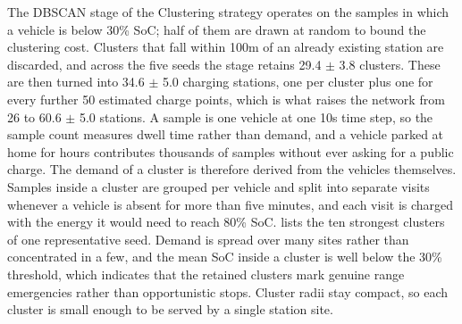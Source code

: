 The \ac{DBSCAN} stage of the Clustering strategy operates on the samples in which a vehicle is below 30\% \ac{SoC}; half of them are drawn at random to bound the clustering cost. Clusters that fall within 100m of an already existing station are discarded, and across the five seeds the stage retains 29.4 $\pm$ 3.8 clusters. These are then turned into 34.6 $\pm$ 5.0 charging stations, one per cluster plus one for every further 50 estimated charge points, which is what raises the network from 26 to 60.6 $\pm$ 5.0 stations. A sample is one vehicle at one 10s time step, so the sample count measures dwell time rather than demand, and a vehicle parked at home for hours contributes thousands of samples without ever asking for a public charge. The demand of a cluster is therefore derived from the vehicles themselves. Samples inside a cluster are grouped per vehicle and split into separate visits whenever a vehicle is absent for more than five minutes, and each visit is charged with the energy it would need to reach 80\% \ac{SoC}.  lists the ten strongest clusters of one representative seed. Demand is spread over many sites rather than concentrated in a few, and the mean \ac{SoC} inside a cluster is well below the 30\% threshold, which indicates that the retained clusters mark genuine range emergencies rather than opportunistic stops. Cluster radii stay compact, so each cluster is small enough to be served by a single station site.

